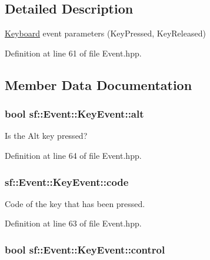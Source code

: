 \subsection{Detailed Description}
\hyperlink{classsf_1_1_keyboard}{Keyboard} event parameters (Key\-Pressed, Key\-Released) 

Definition at line 61 of file Event.\-hpp.



\subsection{Member Data Documentation}
\hypertarget{structsf_1_1_event_1_1_key_event_a915a483317de67d995188a855701fbd7}{
\subsubsection[{alt}]{\setlength{\rightskip}{0pt plus 5cm}bool sf\-::\-Event\-::\-Key\-Event\-::alt}}\label{structsf_1_1_event_1_1_key_event_a915a483317de67d995188a855701fbd7}


Is the Alt key pressed? 



Definition at line 64 of file Event.\-hpp.

\hypertarget{structsf_1_1_event_1_1_key_event_a2879fdab8a68cb1c6ecc45730a2d0e61}{
\subsubsection[{code}]{ sf\-::\-Event\-::\-Key\-Event\-::code}}\label{structsf_1_1_event_1_1_key_event_a2879fdab8a68cb1c6ecc45730a2d0e61}


Code of the key that has been pressed. 



Definition at line 63 of file Event.\-hpp.

\hypertarget{structsf_1_1_event_1_1_key_event_a9255861c2f88501d80ad6b44a310b62f}{
\subsubsection[{control}]{\setlength{\rightskip}{0pt plus 5cm}bool sf\-::\-Event\-::\-Key\-Event\-::control}}\label{structsf_1_1_event_1_1_key_event_a9255861c2f88501d80ad6b44a310b62f}



